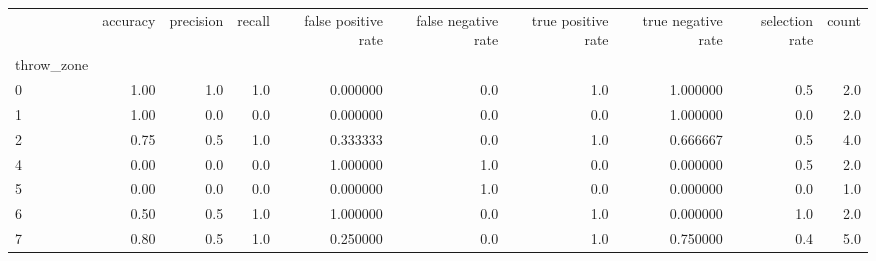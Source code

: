 \begin{tabular}{lrrrrrrrrr}
\toprule
{} &  accuracy &  precision &  recall &  false positive rate &  false negative rate &  true positive rate &  true negative rate &  selection rate &  count \\
throw\_zone &           &            &         &                      &                      &                     &                     &                 &        \\
\midrule
0          &      1.00 &        1.0 &     1.0 &             0.000000 &                  0.0 &                 1.0 &            1.000000 &             0.5 &    2.0 \\
1          &      1.00 &        0.0 &     0.0 &             0.000000 &                  0.0 &                 0.0 &            1.000000 &             0.0 &    2.0 \\
2          &      0.75 &        0.5 &     1.0 &             0.333333 &                  0.0 &                 1.0 &            0.666667 &             0.5 &    4.0 \\
4          &      0.00 &        0.0 &     0.0 &             1.000000 &                  1.0 &                 0.0 &            0.000000 &             0.5 &    2.0 \\
5          &      0.00 &        0.0 &     0.0 &             0.000000 &                  1.0 &                 0.0 &            0.000000 &             0.0 &    1.0 \\
6          &      0.50 &        0.5 &     1.0 &             1.000000 &                  0.0 &                 1.0 &            0.000000 &             1.0 &    2.0 \\
7          &      0.80 &        0.5 &     1.0 &             0.250000 &                  0.0 &                 1.0 &            0.750000 &             0.4 &    5.0 \\
\bottomrule
\end{tabular}
